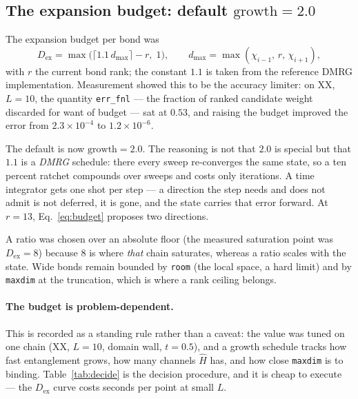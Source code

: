 \documentclass[11pt,a4paper]{article}
\newcommand{\Hb}{\hat{H}}
\newcommand{\Dex}{D_{\mathrm{ex}}}
\newcommand{\code}[1]{\texttt{\small #1}}
\begin{document}
\subsection{The expansion budget: default \texorpdfstring{$\text{growth}=2.0$}{growth = 2.0}}
\label{sec:budget}

The expansion budget per bond was
\begin{equation}
  \Dex = \max\!\big(\lceil 1.1\, d_{\max}\rceil - r,\; 1\big),
  \qquad
  d_{\max} = \max(\chi_{i-1},\, r,\, \chi_{i+1}),
  \label{eq:budget}
\end{equation}
with $r$ the current bond rank; the constant $1.1$ is taken from the reference DMRG
implementation. Measurement showed this to be the accuracy limiter: on XX, $L=10$, the
quantity \code{err\_fnl} --- the fraction of ranked candidate weight discarded for want of
budget --- sat at $0.53$, and raising the budget improved the error from
$2.3\times10^{-4}$ to $1.2\times10^{-6}$.

The default is now $\text{growth} = 2.0$. The reasoning is not that $2.0$ is special but that
$1.1$ is a \emph{DMRG} schedule: there every sweep re-converges the same state, so a ten
percent ratchet compounds over sweeps and costs only iterations. A time integrator gets one
shot per step --- a direction the step needs and does not admit is not deferred, it is gone,
and the state carries that error forward. At $r=13$, Eq.~\eqref{eq:budget} proposes two
directions.

A ratio was chosen over an absolute floor (the measured saturation point was $\Dex=8$)
because $8$ is where \emph{that} chain saturates, whereas a ratio scales with the state. Wide
bonds remain bounded by \code{room} (the local space, a hard limit) and by \code{maxdim} at the
truncation, which is where a rank ceiling belongs.

\paragraph{The budget is problem-dependent.} This is recorded as a standing rule rather than a
caveat: the value was tuned on one chain (XX, $L=10$, domain wall, $t=0.5$), and a growth
schedule tracks how fast entanglement grows, how many channels $\Hb$ has, and how close
\code{maxdim} is to binding. Table~\ref{tab:decide} is the decision procedure, and it is cheap
to execute --- the $\Dex$ curve costs seconds per point at small $L$.
\end{document}
